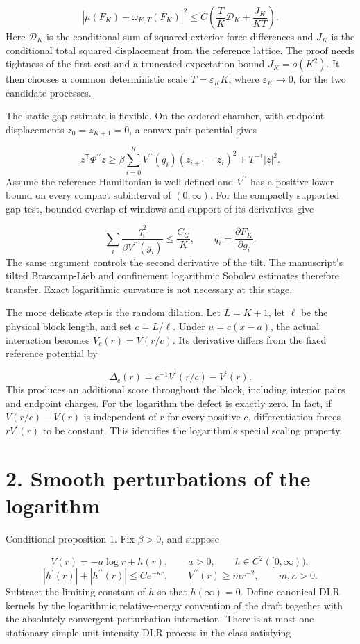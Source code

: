 \documentclass[11pt]{article}
\begin{document}
\[
|\mu(F_K)-\omega_{K,T}(F_K)|^2\leq C\left(\frac{T}{K}\mathcal D_K+\frac{J_K}{KT}\right).
\]
Here $\mathcal D_K$ is the conditional sum of squared exterior-force differences and $J_K$ is the conditional total squared displacement from the reference lattice. The proof needs tightness of the first cost and a truncated expectation bound $J_K=o(K^2)$. It then chooses a common deterministic scale $T=\varepsilon_K K$, where $\varepsilon_K\to0$, for the two candidate processes.

The static gap estimate is flexible. On the ordered chamber, with endpoint displacements $z_0=z_{K+1}=0$, a convex pair potential gives

\[
z^{\mathsf T}\Phi^{\prime\prime}z\geq\beta\sum_{i=0}^{K}V^{\prime\prime}(g_i)(z_{i+1}-z_i)^2+T^{-1}|z|^2.
\]
Assume the reference Hamiltonian is well-defined and $V^{\prime\prime}$ has a positive lower bound on every compact subinterval of $(0,\infty)$. For the compactly supported gap test, bounded overlap of windows and support of its derivatives give

\[
\sum_i\frac{q_i^2}{\beta V^{\prime\prime}(g_i)}\leq\frac{C_G}{K},\qquad q_i=\frac{\partial F_K}{\partial g_i}.
\]
The same argument controls the second derivative of the tilt. The manuscript's tilted Brascamp-Lieb and confinement logarithmic Sobolev estimates therefore transfer. Exact logarithmic curvature is not necessary at this stage.

The more delicate step is the random dilation. Let $L=K+1$, let $\ell$ be the physical block length, and set $c=L/\ell$. Under $u=c(x-a)$, the actual interaction becomes $V_c(r)=V(r/c)$. Its derivative differs from the fixed reference potential by

\[
\Delta_c(r)=c^{-1}V^{\prime}(r/c)-V^{\prime}(r).
\]
This produces an additional score throughout the block, including interior pairs and endpoint charges. For the logarithm the defect is exactly zero. In fact, if $V(r/c)-V(r)$ is independent of $r$ for every positive $c$, differentiation forces $rV^{\prime}(r)$ to be constant. This identifies the logarithm's special scaling property.

\section*{2. Smooth perturbations of the logarithm}
Conditional proposition 1. Fix $\beta>0$, and suppose

\[
V(r)=-a\log r+h(r),\qquad a>0,\qquad h\in C^2([0,\infty)),
\]
\[
|h^{\prime}(r)|+|h^{\prime\prime}(r)|\leq C e^{-\kappa r},\qquad V^{\prime\prime}(r)\geq m r^{-2},\qquad m,\kappa>0.
\]
Subtract the limiting constant of $h$ so that $h(\infty)=0$. Define canonical DLR kernels by the logarithmic relative-energy convention of the draft together with the absolutely convergent perturbation interaction. There is at most one stationary simple unit-intensity DLR process in the class satisfying
\end{document}
